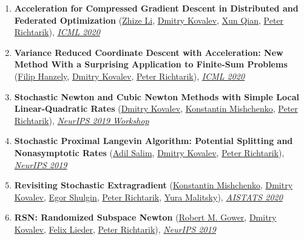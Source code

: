 \begin{enumerate}
\item \textbf{Acceleration for Compressed Gradient Descent in Distributed and Federated Optimization} (\href{https://zhizeli.github.io}{\color{linkcolour}Zhize Li}, \href{https://www.dmitry-kovalev.com}{\color{linkcolour}Dmitry Kovalev}, \href{https://qianxunk.github.io}{\color{linkcolour}Xun Qian}, \href{https://richtarik.org}{\color{linkcolour}Peter Richtarik}), \href{http://proceedings.mlr.press/v119/li20g.html}{\em \color{black}ICML 2020}
\item \textbf{Variance Reduced Coordinate Descent with Acceleration: New Method With a Surprising Application to Finite-Sum Problems} (\href{https://fhanzely.github.io/index.html}{\color{linkcolour}Filip Hanzely}, \href{https://www.dmitry-kovalev.com}{\color{linkcolour}Dmitry Kovalev}, \href{https://richtarik.org}{\color{linkcolour}Peter Richtarik}), \href{http://proceedings.mlr.press/v119/hanzely20b.html}{\em \color{black}ICML 2020}
\item \textbf{Stochastic Newton and Cubic Newton Methods with Simple Local Linear-Quadratic Rates} (\href{https://www.dmitry-kovalev.com}{\color{linkcolour}Dmitry Kovalev}, \href{https://konstmish.github.io}{\color{linkcolour}Konstantin Mishchenko}, \href{https://richtarik.org}{\color{linkcolour}Peter Richtarik}), \href{https://sites.google.com/site/optneurips19/}{\em \color{black}NeurIPS 2019 Workshop}
\item \textbf{Stochastic Proximal Langevin Algorithm: Potential Splitting and Nonasymptotic Rates} (\href{https://adil-salim.github.io}{\color{linkcolour}Adil Salim}, \href{https://www.dmitry-kovalev.com}{\color{linkcolour}Dmitry Kovalev}, \href{https://richtarik.org}{\color{linkcolour}Peter Richtarik}), \href{https://papers.nips.cc/paper/8891-stochastic-proximal-langevin-algorithm-potential-splitting-and-nonasymptotic-rates}{\em \color{black}NeurIPS 2019}
\item \textbf{Revisiting Stochastic Extragradient} (\href{https://konstmish.github.io}{\color{linkcolour}Konstantin Mishchenko}, \href{https://www.dmitry-kovalev.com}{\color{linkcolour}Dmitry Kovalev}, \href{https://shulgin-egor.github.io}{\color{linkcolour}Egor Shulgin}, \href{https://richtarik.org}{\color{linkcolour}Peter Richtarik}, \href{https://scholar.google.com/citations?user=GI_-KjoAAAAJ}{\color{linkcolour}Yura Malitsky}), \href{http://proceedings.mlr.press/v108/mishchenko20a}{\em \color{black}AISTATS 2020}
\item \textbf{RSN: Randomized Subspace Newton} (\href{https://gowerrobert.github.io}{\color{linkcolour}Robert M. Gower}, \href{https://www.dmitry-kovalev.com}{\color{linkcolour}Dmitry Kovalev}, \href{http://www.opt.uni-duesseldorf.de/~lieder/de/inhalt.php}{\color{linkcolour}Felix Lieder}, \href{https://richtarik.org}{\color{linkcolour}Peter Richtarik}), \href{https://papers.nips.cc/paper/8351-rsn-randomized-subspace-newton}{\em \color{black}NeurIPS 2019}

\end{enumerate}
